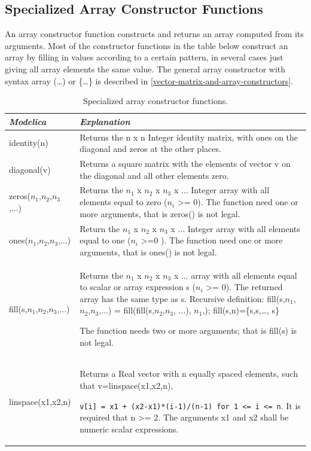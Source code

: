 \documentclass[10pt,a4paper]{report}
\def\doublelabel#1{\label{#1}}
\begin{document}
\subsection{Specialized Array Constructor Functions}\doublelabel{specialized-array-constructor-functions}

An array constructor function constructs and returns an array computed
from its arguments. Most of the constructor functions in the table below
construct an array by filling in values according to a certain pattern,
in several cases just giving all array elements the same value. The
general array constructor with syntax array (\ldots{}) or \{\ldots{}\}
is described in \ref{vector-matrix-and-array-constructors}.

\begin{longtable}[]{|l|p{9cm}|}
\caption{Specialized array constructor functions.}\\
\hline
\emph{Modelica} & \emph{Explanation}\\ \hline
\endhead
identity(n)
&
Returns the n x n Integer identity matrix, with ones on the diagonal and
zeros at the other places.\\ \hline
diagonal(v)
&
Returns a square matrix with the elements of vector v on the diagonal
and all other elements zero.\\ \hline
zeros($n_1$,$n_2$,$n_3$,...) &
Returns the $n_1$ x $n_2$ x $n_3$ x ... Integer array with all elements equal to zero ($n_i$
\textgreater{}= 0). The function need one or more arguments, that is
zeros() is not legal.\\ \hline
ones($n_1$,$n_2$,$n_3$,...) &
Return the $n_1$ x $n_2$ x $n_3$ x ... Integer array with all elements equal to one ($n_i$
\textgreater{}=0 ). The function need one or more arguments, that is
ones() is not legal.\\ \hline
fill(s,$n_1$,$n_2$,$n_3$,...) &
Returns the $n_1$ x $n_2$ x $n_3$ x ... array with all elements equal to scalar or array expression s
($n_i$ \textgreater{}= 0). The returned array has the same
type as s.
Recursive definition:
fill(s,$n_1$,$n_2$,$n_3$,...) =
fill(fill(s,$n_2$,$n_3$, ...),
$n_1$,); fill(s,n)=\{s,s,\ldots{}, s\}

The function needs two or more arguments; that is fill(s) is not
legal.\\ \hline
linspace(x1,x2,n)
&
Returns a Real vector with n equally spaced elements, such that
v=linspace(x1,x2,n),

\lstinline!v[i] = x1 + (x2-x1)*(i-1)/(n-1) for 1 <= i <= n!.
It is required that n \textgreater{}= 2. The arguments x1 and x2 shall
be numeric scalar expressions.\\ \hline
\end{longtable}
\end{document}
